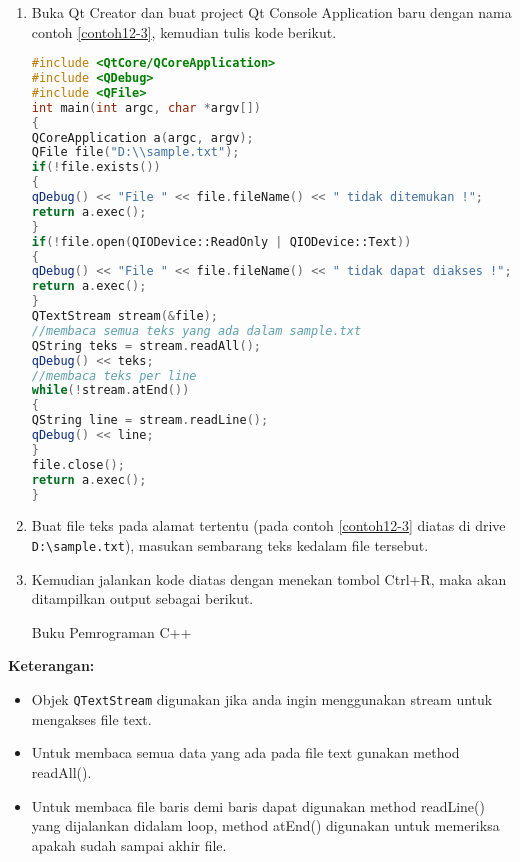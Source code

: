 \begin{enumerate}

\item
  Buka Qt Creator dan buat project Qt Console Application baru dengan
  nama contoh \ref{contoh12-3}, kemudian tulis kode berikut.

\begin{lstlisting}[language=c++, caption=Menggunakan Stream untuk membaca file, label=contoh12-3]
#include <QtCore/QCoreApplication>
#include <QDebug>
#include <QFile>
int main(int argc, char *argv[])
{
QCoreApplication a(argc, argv);
QFile file("D:\\sample.txt");
if(!file.exists())
{
qDebug() << "File " << file.fileName() << " tidak ditemukan !";
return a.exec();
}
if(!file.open(QIODevice::ReadOnly | QIODevice::Text))
{
qDebug() << "File " << file.fileName() << " tidak dapat diakses !";
return a.exec();
}
QTextStream stream(&file);
//membaca semua teks yang ada dalam sample.txt
QString teks = stream.readAll();
qDebug() << teks;
//membaca teks per line
while(!stream.atEnd())
{
QString line = stream.readLine();
qDebug() << line;
}
file.close();
return a.exec();
}
\end{lstlisting}
\item
  Buat file teks pada alamat tertentu (pada contoh \ref{contoh12-3} diatas di drive
  \texttt{D:\textbackslash{}sample.txt}), masukan sembarang teks kedalam
  file tersebut.
\item
  Kemudian jalankan kode diatas dengan menekan tombol Ctrl+R, maka akan
  ditampilkan output sebagai berikut.
  
  \begin{lcverbatim}
  	Buku Pemrograman C++
  \end{lcverbatim}
\end{enumerate}

\textbf{Keterangan:}

\begin{itemize}

\item
  Objek \texttt{QTextStream} digunakan jika anda ingin menggunakan
  stream untuk mengakses file text.
\item
  Untuk membaca semua data yang ada pada file text gunakan method
  readAll().
\item
  Untuk membaca file baris demi baris dapat digunakan method readLine()
  yang dijalankan didalam loop, method atEnd() digunakan untuk memeriksa
  apakah sudah sampai akhir file.
\end{itemize}

